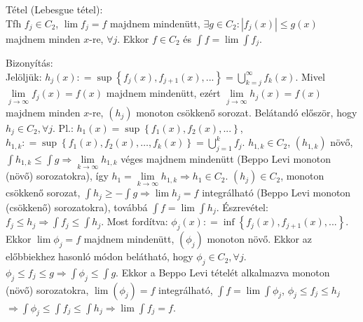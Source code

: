 \documentclass[12pt,a4paper]{scrartcl}
\newenvironment{tetel}{}{}
\newenvironment{bizonyitas}{}{}
\begin{document}
\begin{tetel}

Tétel (Lebesgue tétel):\\
Tfh \(f_{j} \in C_{2}\), \(\lim f_{j} = f\) majdnem mindenütt,
\(\exists g \in C_{2}:\left| {f_{j}\left( x \right)} \right| \leq g\left( x \right)\)
majdnem minden \(x\)-re, \(\forall j\). Ekkor \(f \in C_{2}\) és
\({\int f} = \lim{\int f_{j}}\).

\end{tetel}

\begin{bizonyitas}

Bizonyítás:\\
Jelöljük:
\(h_{j}\left( x \right): = \sup\left\{ {f_{j}\left( x \right),f_{j + 1}\left( x \right),...} \right\} = {\bigcup\limits_{k = j}^{\infty}{f_{k}\left( x \right)}}\).
Mivel
\(\lim\limits_{j\rightarrow\infty}f_{j}\left( x \right) = f\left( x \right)\)
majdnem mindenütt, ezért
\(\lim\limits_{j\rightarrow\infty}h_{j}\left( x \right) = f\left( x \right)\)
majdnem minden \(x\)-re, \(\left( h_{j} \right)\) monoton csökkenő
sorozat. Belátandó először, hogy \(h_{j} \in C_{2},\forall j\). Pl.:
\(h_{1}\left( x \right) = \sup\left\{ {f_{1}\left( x \right),f_{2}\left( x \right),...} \right\}\),
\(h_{1,k}: = \sup\left\{ {f_{1}\left( x \right),f_{2}\left( x \right),\ldots,f_{k}\left( x \right)} \right\} = {\bigcup\limits_{j = 1}^{k}f_{j}}\).
\(h_{1,k} \in C_{2}\), \(\left( h_{1,k} \right)\) növő,
\(\left. {\int h_{1,k}} \leq {\int g}\Rightarrow\lim\limits_{k\rightarrow\infty}h_{1,k} \right.\)
véges majdnem mindenütt (Beppo Levi monoton (növő) sorozatokra), így
\(\left. h_{1} = \lim\limits_{k\rightarrow\infty}h_{1,k}\Rightarrow h_{1} \in C_{2} \right.\).
\(\left( h_{j} \right) \in C_{2}\), monoton csökkenő sorozat,
\(\left. {\int{h_{j} \geq - {\int g}}}\Rightarrow\lim h_{j} = f \right.\)
integrálható (Beppo Levi monoton (csökkenő) sorozatokra), továbbá
\({\int f} = \lim{\int h_{j}}\). Észrevétel:
\(\left. f_{j} \leq h_{j}\Rightarrow{\int f_{j}} \leq {\int h_{j}} \right.\).
Most fordítva:
\(\phi_{j}\left( x \right): = \inf\left\{ {f_{j}\left( x \right),f_{j + 1}\left( x \right),...} \right\}\).
Ekkor \(\lim\phi_{j} = f\) majdnem mindenütt,
\(\left( \phi_{j} \right)\) monoton növő. Ekkor az előbbiekhez hasonló
módon belátható, hogy \(\phi_{j} \in C_{2},\forall j\).
\(\left. \phi_{j} \leq f_{j} \leq g\Rightarrow{\int{\phi_{j} \leq {\int g}}} \right.\).
Ekkor a Beppo Levi tételét alkalmazva monoton (növő) sorozatokra,
\(\lim\left( \phi_{j} \right) = f\) integrálható,
\({\int f} = \lim{\int\phi_{j}}\), \(\phi_{j} \leq f_{j} \leq h_{j}\)
\(\left. \Rightarrow{\int\phi_{j}} \leq {\int f_{j}} \leq {\int h_{j}}\Rightarrow\lim{\int f_{j}} = f \right.\).

\end{bizonyitas}
\end{document}
